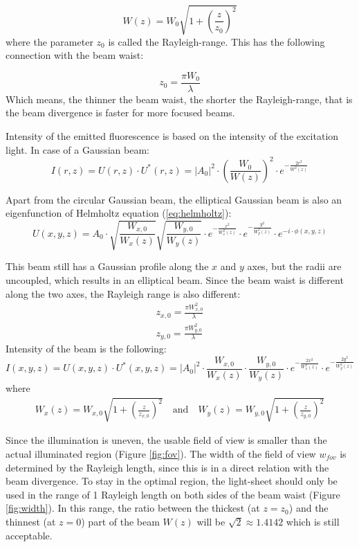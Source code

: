 \documentclass{diploma_style}
\begin{document}
\begin{equation}
    W(z) = W_0\sqrt{1+\left( \frac{z}{z_0} \right)^2}
\end{equation}
where the parameter $z_0$ is called the Rayleigh-range. This has the following connection with the beam waist:

\begin{equation}
    z_0 = \frac{\pi W_0}{\lambda}
\end{equation}
Which means, the thinner the beam waist, the shorter the Rayleigh-range, that is the beam divergence is faster for more focused beams.

Intensity of the emitted fluorescence is based on the intensity of the excitation light. In case of a Gaussian beam:
\begin{equation}
    I(r,z) = U(r,z)\cdot U^*(r,z) = |A_0|^2 \cdot \left( \frac{W_0}{W(z)}\right)^2 \cdot e^{-\frac{2r^2}{W^2(z)}}
\end{equation}

Apart from the circular Gaussian beam, the elliptical Gaussian beam is also an eigenfunction of Helmholtz equation (\ref{eq:helmholtz}):
\begin{equation}
    U(x,y,z) = A_0 \cdot \sqrt{\frac{W_{x,0}}{W_x(z)}} \sqrt{\frac{W_{y,0}}{W_y(z)}} \cdot e^{-\frac{x^2}{W_x^2(z)}} \cdot e^{-\frac{y^2}{W_y^2(z)}} \cdot e^{-i\cdot \phi(x,y,z)}
\end{equation}

This beam still has a Gaussian profile along the $x$ and $y$ axes, but the radii are uncoupled, which results in an elliptical beam. Since the beam waist is different along the two axes, the Rayleigh range is also different:
\begin{align}
    z_{x,0} = \frac{\pi W_{x,0}^2}{\lambda} \\
    z_{y,0} = \frac{\pi W_{y,0}^2}{\lambda}
\end{align}
Intensity of the beam is the following:
\begin{equation}
    I(x,y,z) = U(x,y,z)\cdot U^*(x,y,z) = |A_0|^2 \cdot \frac{W_{x,0}}{W_x(z)} \cdot \frac{W_{y,0}}{W_y(z)} \cdot e^{-\frac{2x^2}{W_x^2(z)}} \cdot e^{-\frac{2y^2}{W_y^2(z)}}
\end{equation}
where
\begin{align}
W_x(z) = W_{x,0}\sqrt{1+\left( \frac{z}{z_{x,0}} \right)^2}\mathrm{\quad and \quad } W_y(z) = W_{y,0}\sqrt{1+\left( \frac{z}{z_{y,0}} \right)^2}
\end{align}

Since the illumination is uneven, the usable field of view is smaller than the actual illuminated region (Figure \ref{fig:fov}). The width of the field of view $w_{fov}$ is determined by the Rayleigh length, since this is in a direct relation with the beam divergence. To stay in the optimal region, the light-sheet should only be used in the range of 1 Rayleigh length on both sides of the beam waist (Figure \ref{fig:width}). In this range, the ratio between the thickest (at $z=z_0$) and the thinnest (at $z=0$) part of the beam $W(z)$ will be $\sqrt{2}\approx 1.4142$ which is still acceptable.
\end{document}
